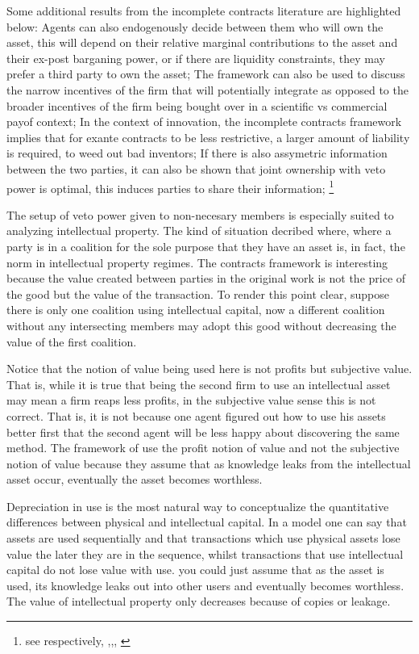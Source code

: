 \documentclass[12pt]{article}
\numberwithin{equation}{section}
\begin{document}
Some additional results from the incomplete contracts literature are highlighted below: Agents can also endogenously decide between them who will own the asset, this will depend on their relative marginal contributions to the asset and their ex-post barganing power, or if there are liquidity constraints, they may prefer a third party to own the asset; The framework can also be used to discuss the narrow incentives of the firm that will potentially integrate as opposed to the broader incentives of the firm being bought over in a scientific vs commercial payof context; In the context of innovation, the incomplete contracts framework implies that for exante contracts to be less restrictive, a larger amount of liability is required, to weed out bad inventors; If there is also assymetric information between the two parties, it can also be shown that joint ownership with veto power is optimal, this induces parties to share their information; \footnote{see respectively, \cite{Aghion1994},\citep{lerner2010contractibility},\citep{anton1994expropriation}, \citep{Rosenkranz1999}}

The setup of veto power given to non-necesary members is especially suited to analyzing intellectual property. The kind of situation decribed where, where a party is in a coalition for the sole purpose that they have an asset is, in fact, the norm in intellectual property regimes. The contracts framework is interesting because the value created between parties in the original work is not the price of the good but the value of the transaction. To render this point clear, suppose there is only one coalition using intellectual capital, now a different coalition without any intersecting members may adopt this good without decreasing the value of the first coalition. 

Notice that the notion of value being used here is not profits but subjective value. That is, while it is true that being the second firm to use an intellectual asset may mean a firm reaps less profits, in the subjective value sense this is not correct. That is, it is not because one agent figured out how to use his assets better first that the second agent will be less happy about discovering the same method. The framework of \cite{anton1994expropriation} use the profit notion of value and not the subjective notion of value because they assume that as knowledge leaks from the intellectual asset occur, eventually the asset becomes worthless. 

Depreciation in use is the most natural way to conceptualize the quantitative differences between physical and intellectual capital. In a model one can say that assets are used sequentially and that transactions which use physical assets lose value the later they are in the sequence, whilst transactions that use intellectual capital do not lose value with use. 
you could just assume that as the asset is used, its knowledge leaks out into other users and eventually becomes worthless. The value of intellectual property only decreases because of copies or leakage. 
\end{document}
